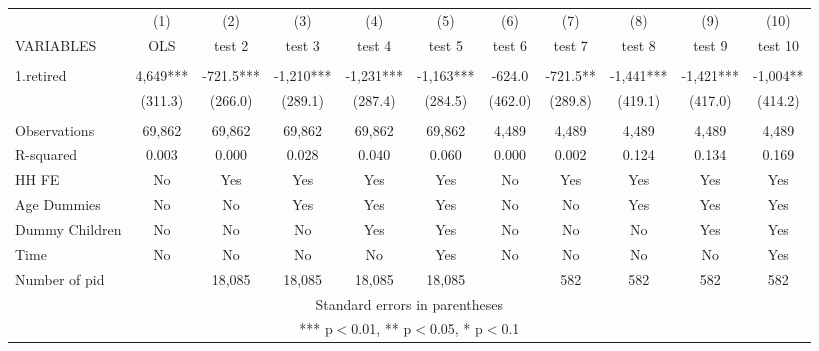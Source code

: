 \begin{tabular}{lcccccccccc} \hline
 & (1) & (2) & (3) & (4) & (5) & (6) & (7) & (8) & (9) & (10) \\
VARIABLES & OLS & test 2 & test 3 & test 4 & test 5 & test 6 & test 7 & test 8 & test 9 & test 10 \\ \hline
 &  &  &  &  &  &  &  &  &  &  \\
1.retired & 4,649*** & -721.5*** & -1,210*** & -1,231*** & -1,163*** & -624.0 & -721.5** & -1,441*** & -1,421*** & -1,004** \\
 & (311.3) & (266.0) & (289.1) & (287.4) & (284.5) & (462.0) & (289.8) & (419.1) & (417.0) & (414.2) \\
 &  &  &  &  &  &  &  &  &  &  \\
Observations & 69,862 & 69,862 & 69,862 & 69,862 & 69,862 & 4,489 & 4,489 & 4,489 & 4,489 & 4,489 \\
R-squared & 0.003 & 0.000 & 0.028 & 0.040 & 0.060 & 0.000 & 0.002 & 0.124 & 0.134 & 0.169 \\
HH FE & No & Yes & Yes & Yes & Yes & No & Yes & Yes & Yes & Yes \\
Age Dummies & No & No & Yes & Yes & Yes & No & No & Yes & Yes & Yes \\
Dummy Children & No & No & No & Yes & Yes & No & No & No & Yes & Yes \\
Time & No & No & No & No & Yes & No & No & No & No & Yes \\
 Number of pid &  & 18,085 & 18,085 & 18,085 & 18,085 &  & 582 & 582 & 582 & 582 \\ \hline
\multicolumn{11}{c}{ Standard errors in parentheses} \\
\multicolumn{11}{c}{ *** p$<$0.01, ** p$<$0.05, * p$<$0.1} \\
\end{tabular}
